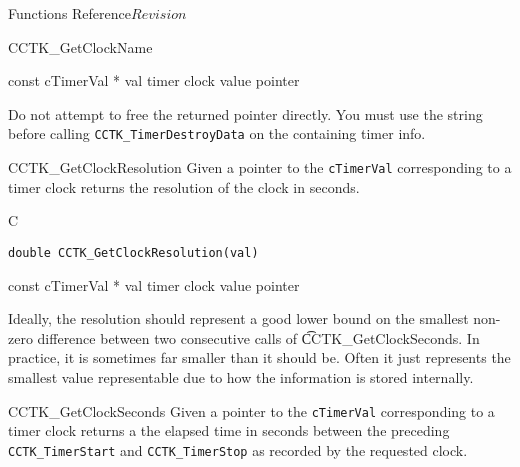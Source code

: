 \begin{cactuspart}{ Functions Reference}{}{$Revision$}
\begin{FunctionDescription}{CCTK\_GetClockName}
\begin{ParameterSection}
\begin{Parameter}{const cTimerVal * val}
timer clock value pointer
\end{Parameter}
\end{ParameterSection}

\begin{Discussion}
Do not attempt to free the returned pointer directly.  You must use the
string before calling {\tt CCTK\_TimerDestroyData} on the containing
timer info.
\end{Discussion}
\end{FunctionDescription}

\begin{FunctionDescription}{CCTK\_GetClockResolution}
\label{CCTK-GetClockResolution}
Given a pointer to the
{\tt cTimerVal} corresponding to a timer clock returns the resolution of
the clock in seconds.

\begin{SynopsisSection}
\begin{Synopsis}{C}
\begin{verbatim}
double CCTK_GetClockResolution(val)
\end{verbatim}
\end{Synopsis}
\end{SynopsisSection}

\begin{ParameterSection}
\begin{Parameter}{const cTimerVal * val}
timer clock value pointer
\end{Parameter}
\end{ParameterSection}

\begin{Discussion}
Ideally, the resolution should represent a good lower bound on the smallest
non-zero difference between two consecutive calls of {\t CCTK\_GetClockSeconds}.
In practice, it is sometimes far smaller than it should be.  Often it just
represents the smallest value representable due to how the information is
stored internally.
\end{Discussion}
\end{FunctionDescription}



\begin{FunctionDescription}{CCTK\_GetClockSeconds}
\label{CCTK-GetClockSeconds}
Given a pointer to the {\tt cTimerVal}
corresponding to a timer clock returns a the elapsed time in seconds between
the preceding {\tt CCTK\_TimerStart} and {\tt CCTK\_TimerStop} as recorded
by the requested clock.


\end{FunctionDescription}
\end{cactuspart}
